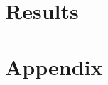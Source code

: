 \documentclass[a4paper,11pt]{article}
\begin{document}
\section{Results}


\clearpage
%


%
\clearpage
%
\appendix
\section{Appendix}

\renewcommand{\thesection}{A\arabic{section}}%
\renewcommand{\thetable}{A\arabic{table}}%
\renewcommand{\thefigure}{A\arabic{figure}}%
\renewcommand{\theequation}{A\arabic{eq}} 
\end{document}
